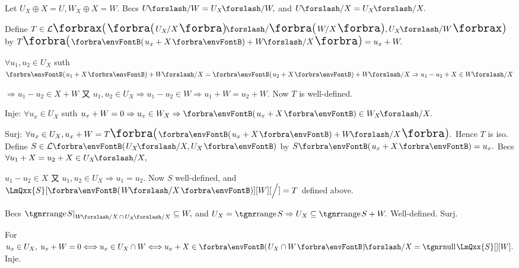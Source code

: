 Let $U_X\oplus X=U,W_X\oplus X=W.$ Becs $U\XSlash W=U_X\XSlash W,$ and $U\XSlash X=U_X\XSlash X.$\vspace{1pt}\par\quad
Define $T\in\Lm[\XPar]{\BigPar{U_X\hspace{-1pt}\Slash X}\XSlash\BigPar{W\hspace{-1.5pt}\Slash X},U_X\XSlash W}$ by $T\BigPar{\Par{u_x+X}+W\XSlash X}=u_x+W.$\par\quad
$\forall u_1,u_2\in U_X$ suth $\Par{u_1+X}+W\XSlash X=\Par{u_2+X}+W\XSlash X\Rightarrow u_1-u_2+X\in W\XSlash X$\par\quad
$\Rightarrow u_1-u_2\in X+W$ 又 $u_1,u_2\in U_X\Rightarrow u_1-u_2\in W\Rightarrow u_1+W=u_2+W.$ \;Now $T$ is well-defined.\par\quad
Inje: $\forall u_x\in U_X$ suth $u_x+W=0\Rightarrow u_x\in W_X\Rightarrow\Par{u_x+X}\in W_X\XSlash X.$\par\quad
Surj: $\forall u_x\in U_X,u_x+W=T\BigPar{\Par{u_x+X}+W\XSlash X}.$ \;Hence $T$ is iso.\PfEnd\vspace{6pt}\quad
\Or Define $S\in\Lm{U_X\XSlash X,U_X}$ by $S\Par{u_x+X}=u_x.$
Becs $\forall u_1+X=u_2+X\in U_X\XSlash X,$\par\quad
$u_1-u_2\in X$ 又 $u_1,u_2\in U_X\Rightarrow u_1=u_2.$ Now $S$ well-defined, and $\LmQxx{S}[\SmallPar{W\XSlash X}][W][\Big/]=T$ defined above.\par\quad
Becs $\range S\mmid_{W\XSlash X\,\cap\,U_X\XSlash X}\subseteq W,$ and $U_X=\range S\Rightarrow U_X\subseteq\range S+W.$ \;Well-defined. Surj.\par\quad
For $u_x\in U_X,\;u_x+W=0\Longleftrightarrow u_x\in U_X\cap W\Longleftrightarrow u_x+X\in\Par{U_X\cap W}\XSlash X=\null\LmQxx{S}[][W].$ \;Inje.\PfEnd
\SepLine\pagebreak



